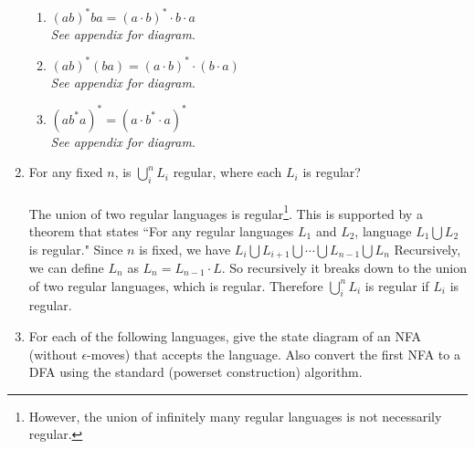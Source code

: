 \documentclass[10pt,a4paper,final]{article}
\begin{document}
\begin{enumerate}
\begin{enumerate}
  \item $(ab)^*ba = (a \cdot b)^* \cdot b \cdot a$\\
  \emph{See appendix for diagram}.

  \item $(ab)^* (ba) = (a \cdot b)^* \cdot (b \cdot a)$\\
  \emph{See appendix for diagram}.

  \item $(ab^*a)^* = (a \cdot b^* \cdot a)^*$\\
  \emph{See appendix for diagram}.
  \end{enumerate}

\item %
For any fixed $n$, is $\bigcup_i^n L_i$ regular, where each $L_i$ is regular?\\
\\
The union of two regular languages is regular\footnote{However, the union of infinitely many regular languages is not necessarily regular.}.
This is supported by a theorem that states
``For any regular languages $L_1$ and $L_2$, language $L_1 \bigcup L_2$ is regular.\cite{sipser}"
Since $n$ is fixed, we have $L_i \bigcup L_{i+1} \bigcup \cdots \bigcup L_{n-1} \bigcup L_n$
Recursively, we can define $L_n$ as $L_n = L_{n-1} \cdot L$. So recursively it breaks down to the
union of two regular languages, which is regular.
Therefore $\bigcup_i^n L_i$ is regular if $L_i$ is regular.


\item %
For each of the following languages, give the state diagram of an NFA (without $\epsilon$-moves)
that accepts the language. Also convert the first NFA to a DFA using the standard (powerset
construction) algorithm.

  

\end{enumerate}
\end{document}
